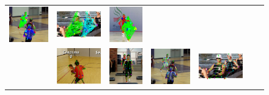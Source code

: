 \begin{figure}
\begin{tabular}{c c c c c c c}
    \includegraphics[height=0.140\linewidth]{imgidx_1652_graph_mpii_multi.pdf}&
    \includegraphics[height=0.140\linewidth]{imgidx_0472_graph_mpii_multi.pdf}&
    \includegraphics[height=0.140\linewidth]{imgidx_0630_graph_mpii_multi.pdf}\\
    &
    \includegraphics[height=0.140\linewidth]{imgidx_1674_sticks_mpii_multi.pdf}& 
    \includegraphics[height=0.140\linewidth]{imgidx_0564_sticks_mpii_multi.pdf}&
    \includegraphics[height=0.140\linewidth]{imgidx_1652_sticks_mpii_multi.pdf}&
    \includegraphics[height=0.140\linewidth]{imgidx_0472_sticks_mpii_multi.pdf}&

\end{tabular}
\end{figure}
